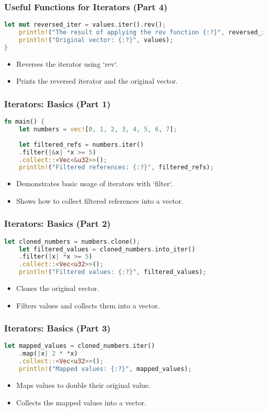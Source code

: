 \documentclass[aspectratio=169, table]{beamer}
\begin{document}
\begin{frame}[fragile]
\frametitle{Useful Functions for Iterators (Part 4)}
\begin{lstlisting}[language=Rust]
	let mut reversed_iter = values.iter().rev();
	println!("The result of applying the rev function {:?}", reversed_iter.collect::<Vec<_>>());
	println!("Original vector: {:?}", values);
}
\end{lstlisting}
\begin{itemize}
\item Reverses the iterator using `rev`.
\item Prints the reversed iterator and the original vector.
\end{itemize}
\end{frame}



\begin{frame}[fragile]
\frametitle{Iterators: Basics (Part 1)}
\begin{lstlisting}[language=Rust]
fn main() {
	let numbers = vec![0, 1, 2, 3, 4, 5, 6, 7];
	
	let filtered_refs = numbers.iter()
	.filter(|&x| *x >= 5)
	.collect::<Vec<&u32>>();
	println!("Filtered references: {:?}", filtered_refs);
\end{lstlisting}
\begin{itemize}
	\item Demonstrates basic usage of iterators with `filter`.
	\item Shows how to collect filtered references into a vector.
\end{itemize}
\end{frame}

\begin{frame}[fragile]
\frametitle{Iterators: Basics (Part 2)}
\begin{lstlisting}[language=Rust]
	let cloned_numbers = numbers.clone();
	let filtered_values = cloned_numbers.into_iter()
	.filter(|x| *x >= 5)
	.collect::<Vec<u32>>();
	println!("Filtered values: {:?}", filtered_values);
\end{lstlisting}
\begin{itemize}
	\item Clones the original vector.
	\item Filters values and collects them into a vector.
\end{itemize}
\end{frame}

\begin{frame}[fragile]
\frametitle{Iterators: Basics (Part 3)}
\begin{lstlisting}[language=Rust]
	let mapped_values = cloned_numbers.iter()
	.map(|x| 2 * *x)
	.collect::<Vec<u32>>();
	println!("Mapped values: {:?}", mapped_values);
\end{lstlisting}
\begin{itemize}
	\item Maps values to double their original value.
	\item Collects the mapped values into a vector.
\end{itemize}
\end{frame}
\end{document}
